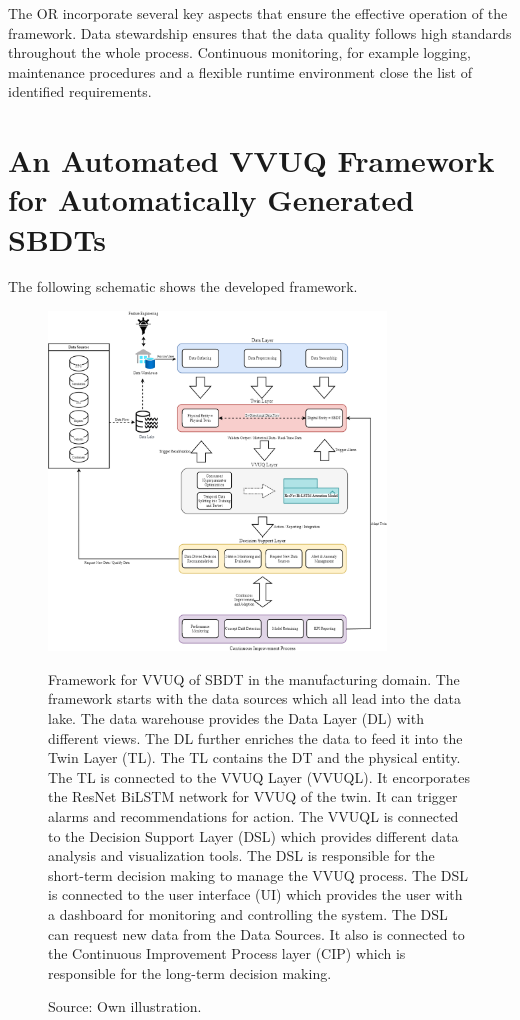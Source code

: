 The OR incorporate several key aspects that ensure the effective operation of the framework. Data stewardship ensures that the data quality follows high standards throughout the whole process. Continuous monitoring, for example logging, maintenance procedures and a flexible runtime environment close the list of identified requirements.

\section{An Automated VVUQ Framework for Automatically Generated SBDTs}
\label{sec:framework}

The following schematic shows the developed framework.

\begin{figure}[htbp]
\centering
\includegraphics[width=0.8\textwidth]{figures/framework.png}
\caption{Framework for VVUQ of SBDT in the manufacturing domain. The framework starts with the data sources which all lead into the data lake. The data warehouse provides the Data Layer (DL) with different views. The DL further enriches the data to feed it into the Twin Layer (TL). The TL contains the DT and the physical entity. The TL is connected to the VVUQ Layer (VVUQL). It encorporates the ResNet BiLSTM network for VVUQ of the twin. It can trigger alarms and recommendations for action. The VVUQL is connected to the Decision Support Layer (DSL) which provides different data analysis and visualization tools. The DSL is responsible for the short-term decision making to manage the VVUQ process. The DSL is connected to the user interface (UI) which provides the user with a dashboard for monitoring and controlling the system. The DSL can request new data from the Data Sources. It also is connected to the Continuous Improvement Process layer (CIP) which is responsible for the long-term decision making.}
\caption*{Source: Own illustration.}
\label{fig:framework}


\end{figure}
